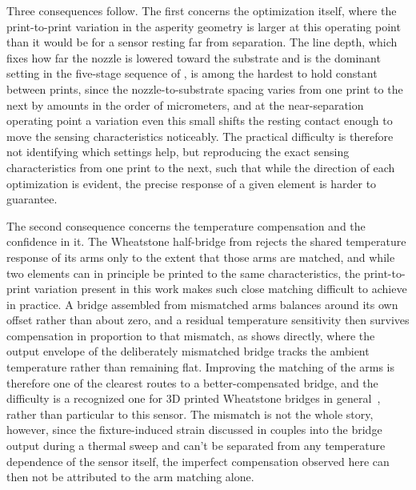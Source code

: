 Three consequences follow. The first concerns the optimization itself, where the print-to-print variation in the asperity geometry is larger at this operating point than it would be for a sensor resting far from separation. The line depth, which fixes how far the nozzle is lowered toward the substrate and is the dominant setting in the five-stage sequence of , is among the hardest to hold constant between prints, since the nozzle-to-substrate spacing varies from one print to the next by amounts in the order of micrometers, and at the near-separation operating point a variation even this small shifts the resting contact enough to move the sensing characteristics noticeably. The practical difficulty is therefore not identifying which settings help, but reproducing the exact sensing characteristics from one print to the next, such that while the direction of each optimization is evident, the precise response of a given element is harder to guarantee.

The second consequence concerns the temperature compensation and the confidence in it. The Wheatstone half-bridge from  rejects the shared temperature response of its arms only to the extent that those arms are matched, and while two elements can in principle be printed to the same characteristics, the print-to-print variation present in this work makes such close matching difficult to achieve in practice. A bridge assembled from mismatched arms balances around its own offset rather than about zero, and a residual temperature sensitivity then survives compensation in proportion to that mismatch, as  shows directly, where the output envelope of the deliberately mismatched bridge tracks the ambient temperature rather than remaining flat. Improving the matching of the arms is therefore one of the clearest routes to a better-compensated bridge, and the difficulty is a recognized one for 3D printed Wheatstone bridges in general~\cite{3DprintWheatstoneStrain}, rather than particular to this sensor. The mismatch is not the whole story, however, since the fixture-induced strain discussed in  couples into the bridge output during a thermal sweep and can't be separated from any temperature dependence of the sensor itself, the imperfect compensation observed here can then not be attributed to the arm matching alone.


